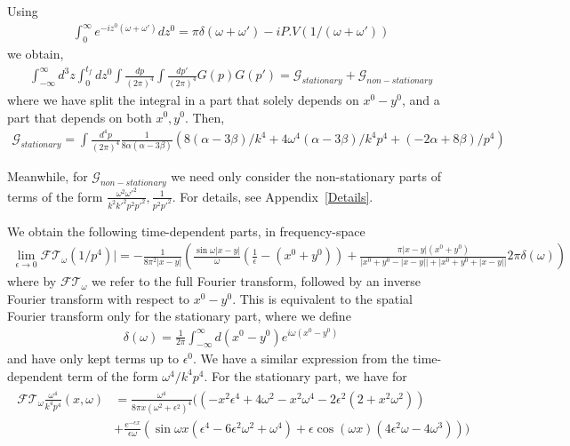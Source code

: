 \documentclass[aps,preprintnumbers,superscriptaddress,longbibliography]{revtex4-1}
\begin{document}
Using
\begin{align}
    \int^\infty_0e^{-iz^0(\omega+\omega')}dz^0=\pi\delta(\omega+\omega')-iP.V(1/(\omega+\omega'))
\end{align}
we obtain,
\begin{align}
    \int ^{\infty}_{-\infty}d^3z\int^{t_f}_0dz^0\int\frac{dp}{(2\pi)^4}\int\frac{dp'}{(2\pi)^4}G(p)G(p')=\mathcal{G}_{stationary}+\mathcal{G}_{non-stationary}
\end{align}
where we have split the integral in a part that solely depends on $x^0-y^0$, and a part that depends on both $x^0,y^0$. Then, 
\begin{align}
    \mathcal{G}_{stationary}=\int\frac{d^4p}{(2\pi)^4}\frac{1}{8\alpha(\alpha-3\beta)} (8(\alpha-3\beta)/k^4+4\omega^4(\alpha-3\beta)/k^4p^4+(-2\alpha+8\beta)/p^4)
\end{align}

Meanwhile, for $\mathcal{G}_{non-stationary}$ we need only consider the non-stationary parts of terms of the form $\frac{\omega^2\omega'^2}{k^2k'^2p^2p'^2},\frac{1}{p^2p'^2}$. For details, see Appendix~\ref{Details}.

We obtain the following time-dependent parts, in frequency-space 
\begin{align}
  \lim_{\epsilon\rightarrow0}  \mathcal{FT}_{\omega}(1/p^4)|=-\frac{1}{8\pi^2|x-y|}(\frac{\sin{\omega|x-y|}}{\omega}(\frac{1}{\epsilon}-(x^0+y^0))+\frac{\pi|x-y|(x^0+y^0) }{|x^0+y^0-|x-y||+|x^0+y^0+|x-y||}2\pi\delta(\omega))
\end{align}
where by $\mathcal{FT}_{\omega}$ we refer to the full Fourier transform, followed by an inverse Fourier transform with respect to $x^0-y^0$. This is equivalent to the spatial Fourier transform only for the stationary part,
where we define 
\begin{align}
    \delta(\omega)=\frac{1}{2\pi}\int^\infty_{-\infty}d(x^0-y^0)e^{i\omega(x^0-y^0)}
\end{align}
and have only kept terms up to $\epsilon^0$.
We have a similar expression from the time-dependent term of the form $\omega^4/k^4p^4$.
For the stationary part, we have for
\begin{align}
  \begin{split}  \mathcal{FT}_{\omega}\frac{\omega^4}{k^4p^4}(x,\omega)&=\frac{\omega^4}{8\pi x(\omega^2+\epsilon^2)^4}((-x^2\epsilon^4+4\omega^2-x^2\omega^4-2\epsilon^2(2+x^2\omega^2))\\&+\frac{e^{-\epsilon x}}{\epsilon\omega}(\sin{\omega x}(\epsilon^4-6\epsilon^2\omega^2+\omega^4)+\epsilon\cos(\omega x)(4\epsilon^2\omega-4\omega^3)))
    \end{split}
\end{align}
\end{document}
